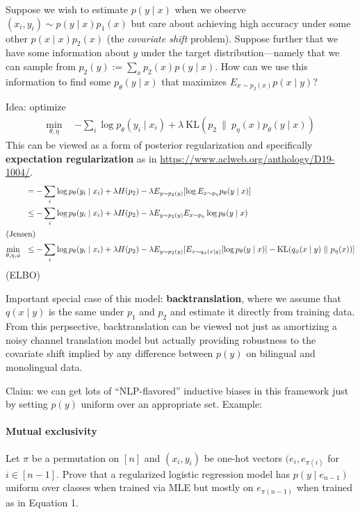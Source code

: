\documentclass{article}
\newcommand{\KL}[2]{\mathrm{KL}(#1~\|~#2)}
\begin{document}
Suppose we wish to estimate $p(y \mid x)$ when we observe $(x_i, y_i) \sim p(y
\mid x) p_1(x) $ but care about achieving high accuracy under some other $p(x
\mid x) p_2(x)$ (the \emph{covariate shift} problem). Suppose further that we
have some information about $y$ under the target distribution---namely that we
can sample from $p_2(y) := \sum_x p_2(x) p(y \mid x)$. How can we use this
information to find some $p_\theta(y \mid x)$ that maximizes $E_{x \sim p_2(x)} p(x
\mid y)$?

Idea: optimize
\begin{align}
  \min_{\theta,\eta} ~~ &-\sum_i \log p_\theta(y_i \mid x_i) + \lambda~\KL{p_2}{p_\eta(x)
  p_\theta(y \mid x)}
\end{align}
This can be viewed as a form of posterior regularization and specifically
\textbf{expectation regularization} as in
\url{https://www.aclweb.org/anthology/D19-1004/}.
\begin{align}
  &= -\sum_i \log p_\theta(y_i \mid x_i) + \lambda H(p_2) - \lambda E_{y \sim p_2(y)}
  [\log E_{x \sim p_\eta} p_\theta(y \mid x)] \\
  &\leq -\sum_i \log p_\theta(y_i \mid x_i) + \lambda H(p_2) -  \lambda E_{y \sim p_2(y)}
  E_{x \sim p_\eta} \log p_\theta(y \mid x) \\
  \intertext{(Jensen)}
  \min_{\theta, \eta, \phi} ~~ &\leq -\sum_i \log p_\theta(y_i \mid x_i) + \lambda H(p_2) -  \lambda E_{y \sim p_2(y)}[
  E_{x \sim q_\phi(x \mid y)} [\log p_\theta(y \mid x)] -\KL{q_\phi(x \mid y)}
  {p_\eta(x)}]
\end{align}
(ELBO)

Important special case of this model: \textbf{backtranslation}, where we assume
that $q(x \mid y)$ is the same under $p_1$ and $p_2$ and estimate it directly
from training data. From this perpsective, backtranslation can be viewed not
just as amortizing a noisy channel translation model but actually providing
robustness to the covariate shift implied by any difference between $p(y)$ on
bilingual and monolingual data.

Claim: we can get lots of ``NLP-flavored'' inductive biases in this framework
just by setting $p(y)$ uniform over an appropriate set. Example:

\paragraph{Mutual exclusivity}
Let $\pi$ be a permutation on $[n]$ and $(x_i, y_i)$ be one-hot vectors $(e_i,
e_{\pi(i)}$ for $i \in [n-1]$. Prove that a regularized logistic regression
model has $p(y \mid e_{n-1})$ uniform over classes when trained via MLE but
mostly on $e_{\pi(n-1)}$ when trained as in Equation 1.
\end{document}
